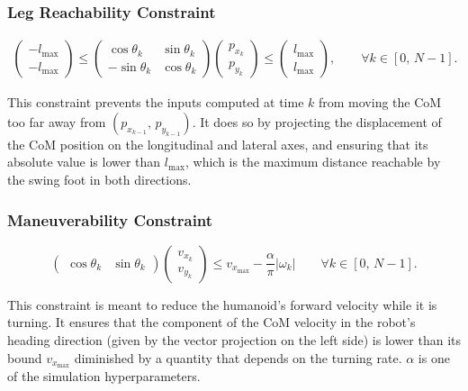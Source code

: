 \subsubsection{Leg Reachability Constraint}
\begin{align}
    \begin{pmatrix}
        -l_{\max} \\[1ex]
        -l_{\max}
    \end{pmatrix}
    \le
    \begin{pmatrix}
        \cos\theta_{k} & \sin\theta_{k} \\[1ex]
        -\sin\theta_{k} & \cos\theta_{k}
    \end{pmatrix}
    \begin{pmatrix}
        p_{x_{k}} \\[1ex]
        p_{y_{k}}
    \end{pmatrix}
    \le
    \begin{pmatrix}
        l_{\max} \\[1ex]
        l_{\max}
    \end{pmatrix}
    , \qquad \forall k \in \left[ 0,\, N-1\right].
\end{align}

This constraint prevents the inputs computed at time $k$ from moving the CoM too far away from $(p_{x_{k-1}},\,p_{y_{k-1}})$.
It does so by projecting the displacement of the CoM position on the longitudinal and lateral axes, and ensuring that its absolute value is lower than $l_{\max}$, which is the maximum distance reachable by the swing foot in both directions.

\subsubsection{Maneuverability Constraint}
\[
\begin{pmatrix}
\cos \theta_k & \sin \theta_k
\end{pmatrix}
\begin{pmatrix}
v_{x_k} \\
v_{y_k}
\end{pmatrix}
\leq v_{x_{\max}} - \frac{\alpha}{\pi} |\omega_k|
\qquad \forall k \in \left[0,\, N-1 \right].
\]

This constraint is meant to reduce the humanoid's forward velocity while it is turning. It ensures that the component of the CoM velocity in the robot's heading direction (given by the vector projection on the left side) is lower than its bound $v_{x_{\max}}$ diminished by a quantity that depends on the turning rate. $\alpha$ is one of the simulation hyperparameters.

